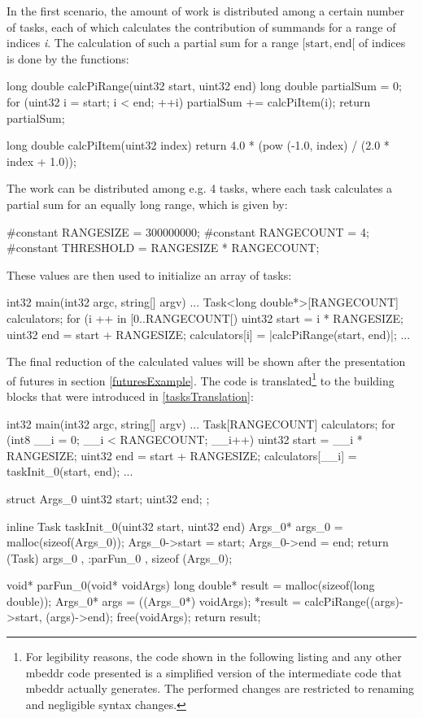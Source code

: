 In the first scenario, the amount of work is distributed among a certain number of tasks, each of which calculates the contribution of summands for a range of indices \textit{i}. The calculation of such a partial sum for a range $[\mathrm{start}, \mathrm{end}[$ of indices is done by the functions:
\begin{ccode}
long double calcPiRange(uint32 start, uint32 end) { 
  long double partialSum = 0; 
  for (uint32 i = start; i < end; ++i) { 
    partialSum += calcPiItem(i); 
  }
  return partialSum; 
}
 
long double calcPiItem(uint32 index) { 
  return 4.0 * (pow (-1.0, index) / (2.0 * index + 1.0)); 
}
\end{ccode}
The work can be distributed among e.g. 4 tasks, where each task calculates a partial sum for an equally long range, which is given by:
\begin{ccode}
#constant RANGESIZE = 300000000;
#constant RANGECOUNT = 4; 
#constant THRESHOLD = RANGESIZE * RANGECOUNT;
\end{ccode}
These values are then used to initialize an array of tasks:
\begin{ccode}
int32 main(int32 argc, string[] argv) {
...
  Task<long double*>[RANGECOUNT] calculators;
  for (i ++ in [0..RANGECOUNT[) { 
    uint32 start = i * RANGESIZE; 
    uint32 end = start + RANGESIZE; 
    calculators[i] = |calcPiRange(start, end)|; 
  }
...
}
\end{ccode}
The final reduction of the calculated values will be shown after the presentation of futures in section \ref{futuresExample}. The code is translated\footnote{For legibility reasons, the code shown in the following listing and any other mbeddr code presented is a simplified version of the intermediate code that mbeddr actually generates. The performed changes are restricted to renaming and negligible syntax changes.} to the building blocks that were introduced in \ref{tasksTranslation}:
\begin{ccode}

int32 main(int32 argc, string[] argv) {
...
  Task[RANGECOUNT] calculators;
  for (int8 __i = 0; __i < RANGECOUNT; __i++) { 
    uint32 start = __i * RANGESIZE; 
    uint32 end = start + RANGESIZE; 
    calculators[__i] = taskInit_0(start, end); 
  }
...
}

struct Args_0 { 
  uint32 start; 
  uint32 end; 
};

inline Task taskInit_0(uint32 start, uint32 end) { 
  Args_0* args_0 = malloc(sizeof(Args_0)); 
  Args_0->start = start; 
  Args_0->end = end; 
  return (Task){ args_0 , :parFun_0 , sizeof (Args_0)}; 
}

void* parFun_0(void* voidArgs) { 
  long double* result = malloc(sizeof(long double)); 
  Args_0* args = ((Args_0*) voidArgs); 
  *result = calcPiRange((args)->start, (args)->end); 
  free(voidArgs); 
  return result; 
}
\end{ccode}
